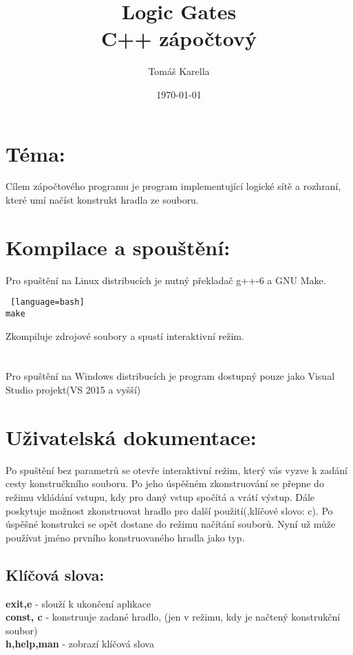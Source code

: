 \documentclass[12pt, oneside]{article}
\title{\vspace{-12ex}Logic Gates \\ C++ zápočtový }
\author{\vspace{-10ex}Tomáš Karella}
\date{\today}
\begin{document}
\maketitle
\section*{Téma:} Cílem zápočtového programu je program implementující logické sítě a rozhraní, které umí načíst konstrukt hradla ze souboru.
\section*{Kompilace a spouštění:} Pro spuštění na Linux distribucích je nutný překladač g++-6 a GNU Make.  \\
\begin{lstlisting} [language=bash]
make
\end{lstlisting} 
Zkompiluje zdrojové soubory a spustí interaktivní režim. \\
\\ \\
Pro spuštění na Windows distribucích je program dostupný pouze jako Visual Studio projekt(VS 2015 a vyšší) \\ 
\section*{Uživatelská dokumentace:}
Po spuštění bez parametrů se otevře interaktivní režim, který vás vyzve k zadání cesty konstručkního souboru. Po jeho úspěšném zkonstruování se přepne do  režimu vkládání vstupu, kdy pro daný vstup spočítá a vrátí výstup. Dále poskytuje možnost zkonstruovat hradlo pro další použití(,klíčové slovo: c).  Po úspěšné konstrukci se opět dostane do režimu načítání souborů. Nyní už může používat jméno prvního konstruovaného hradla jako typ. \\
\subsection*{Klíčová slova:} 
\textbf{exit,e} - slouží k ukončení aplikace \\
\textbf{const, c} - konstruuje zadané hradlo, (jen v režimu, kdy je načtený konstrukční soubor) \\
\textbf{h,help,man} - zobrazí klíčová slova \\
\end{document}
